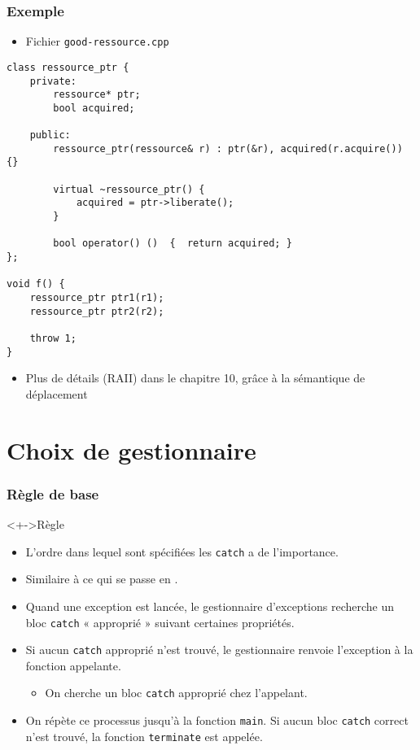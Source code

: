 \begin{frame}[containsverbatim]
\frametitle{Exemple}
\begin{itemize}
\item Fichier \texttt{good-ressource.cpp}
\end{itemize}
\begin{lstlisting}
class ressource_ptr {
	private:
		ressource* ptr;
		bool acquired;

	public:
		ressource_ptr(ressource& r) : ptr(&r), acquired(r.acquire()) {}

		virtual ~ressource_ptr() {
			acquired = ptr->liberate();
		}
		
		bool operator() ()  {  return acquired; }
};

void f() {
	ressource_ptr ptr1(r1);
	ressource_ptr ptr2(r2);

	throw 1;
}
\end{lstlisting}
\begin{itemize}
\item Plus de détails (RAII) dans le chapitre 10, grâce à la sémantique de déplacement
\end{itemize}
\end{frame}

\section{Choix de gestionnaire}

\begin{frame}
\frametitle{Règle de base}
\begin{alertblock}<+->{Règle}
	\begin{itemize}[<+->]
	\item L'ordre dans lequel sont spécifiées les \texttt{catch} a de l'importance.
	\end{itemize}
\end{alertblock}
\begin{itemize}[<+->]
\item Similaire à ce qui se passe en \java.
\item Quand une exception est lancée, le gestionnaire d'exceptions recherche un bloc \texttt{catch} « approprié » suivant certaines propriétés.
\item Si aucun \texttt{catch} approprié n'est trouvé, le gestionnaire renvoie l'exception à la fonction appelante.
	\begin{itemize}
	\item On cherche un bloc \texttt{catch} approprié chez l'appelant.
	\end{itemize}
\item On répète ce processus jusqu'à la fonction \texttt{main}. Si aucun bloc \texttt{catch} correct n'est trouvé, la fonction \texttt{terminate} est appelée.
\end{itemize}
\end{frame}

